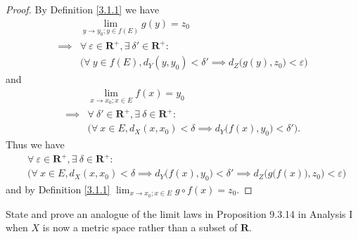 \begin{proof}
    By Definition \ref{3.1.1} we have
    \begin{align*}
                 & \lim_{y \to y_0 ; y \in f(E)} g(y) = z_0                                                           \\
        \implies & \forall\ \varepsilon \in \mathbf{R}^+, \exists\ \delta' \in \mathbf{R}^+ :                         \\
                 & \Big(\forall\ y \in f(E), d_Y(y, y_0) < \delta' \implies d_Z\big(g(y), z_0\big) < \varepsilon\Big)
    \end{align*}
    and
    \begin{align*}
                 & \lim_{x \to x_0 ; x \in E} f(x) = y_0                                                       \\
        \implies & \forall\ \delta' \in \mathbf{R}^+, \exists\ \delta \in \mathbf{R}^+ :                       \\
                 & \Big(\forall\ x \in E, d_X(x, x_0) < \delta \implies d_Y\big(f(x), y_0\big) < \delta'\Big).
    \end{align*}
    Thus we have
    \begin{align*}
         & \forall\ \varepsilon \in \mathbf{R}^+, \exists\ \delta \in \mathbf{R}^+ :                                                                             \\
         & \bigg(\forall\ x \in E, d_X(x, x_0) < \delta \implies d_Y\big(f(x), y_0\big) < \delta' \implies d_Z\Big(g\big(f(x)\big), z_0\Big) < \varepsilon\bigg)
    \end{align*}
    and by Definition \ref{3.1.1} \(\lim_{x \to x_0 ; x \in E} g \circ f(x) = z_0\).
\end{proof}

\begin{exercise}\label{ex 3.1.6}
    State and prove an analogue of the limit laws in Proposition 9.3.14 in Analysis I when \(X\) is now a metric space rather than a subset of \(\mathbf{R}\).
\end{exercise}